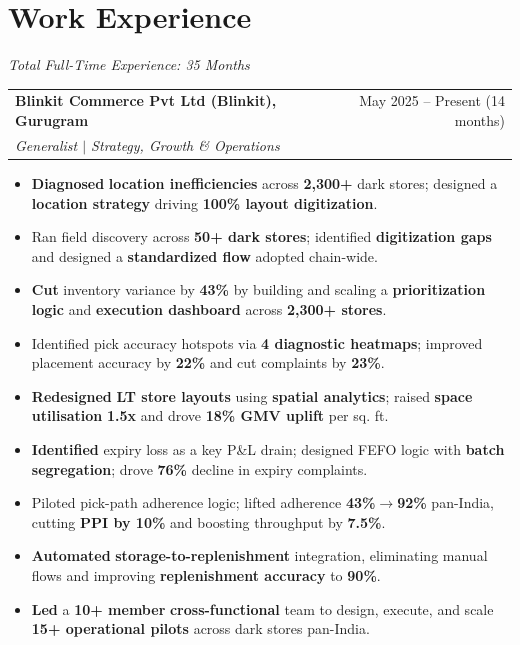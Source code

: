 \documentclass[a4paper,10pt]{article}
\makeatletter
\newcommand{\role}[4]{%
  \vspace{1pt}%
  \begin{tabular*}{\textwidth}{l@{\extracolsep{\fill}}r}
    \textbf{\small #1} & \small #2 \\
    \textit{\small #3} & \textit{\small #4} \\
  \end{tabular*}\vspace{0pt}%
}
\newcommand{\blist}{\begin{itemize}[leftmargin=0.15in, label={--}, itemsep=-1pt, topsep=3pt, parsep=0pt]}
\newcommand{\elistb}{\end{itemize}\vspace{0pt}}
\makeatother
\begin{document}
\section{Work Experience}
\vspace{0pt}
\small{\textit{Total Full-Time Experience: 35 Months}}
\vspace{1pt}

\role{Blinkit Commerce Pvt Ltd (Blinkit), Gurugram}{May 2025 -- Present (14 months)}{Generalist $|$ Strategy, Growth \& Operations}{}
\blist
  \item \small \textbf{Diagnosed} \textbf{location inefficiencies} across \textbf{2,300+} dark stores; designed a \textbf{location strategy} driving \textbf{100\% layout digitization}.
  \item \small Ran field discovery across \textbf{50+ dark stores}; identified \textbf{digitization gaps} and designed a \textbf{standardized flow} adopted chain-wide.
  \item \small \textbf{Cut} inventory variance by \textbf{43\%} by building and scaling a \textbf{prioritization logic} and \textbf{execution dashboard} across \textbf{2,300+ stores}.
  \item \small Identified pick accuracy hotspots via \textbf{4 diagnostic heatmaps}; improved placement accuracy by \textbf{22\%} and cut complaints by \textbf{23\%}.
  \item \small \textbf{Redesigned} \textbf{LT store layouts} using \textbf{spatial analytics}; raised \textbf{space utilisation} \textbf{1.5x} and drove \textbf{18\% GMV uplift} per sq. ft.
  \item \small \textbf{Identified} expiry loss as a key P\&L drain; designed FEFO logic with \textbf{batch segregation}; drove \textbf{76\%} decline in expiry complaints.
  \item \small Piloted pick-path adherence logic; lifted adherence \textbf{43\%$\to$92\%} pan-India, cutting \textbf{PPI by 10\%} and boosting throughput by \textbf{7.5\%}.
  \item \small \textbf{Automated} \textbf{storage-to-replenishment} integration, eliminating manual flows and improving \textbf{replenishment accuracy} to \textbf{90\%}.
  \item \small \textbf{Led} a \textbf{10+ member} \textbf{cross-functional} team to design, execute, and scale \textbf{15+ operational pilots} across dark stores pan-India.
\elistb
\end{document}

